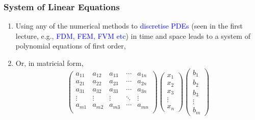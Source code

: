 \documentclass[10pt,compress]{beamer}
\begin{document}
\begin{frame}
 \frametitle{System of Linear Equations} 
\begin{enumerate}
  \item <1-> Using any of the numerical methods to \textcolor{blue}{discretise PDEs} (seen in the first lecture, e.g., \textcolor{blue}{FDM, FEM, FVM etc}) in time and space leads to a system of polynomial equations of first order, 
\item <3-> Or, in matricial form,
\begin{equation}
\begin{pmatrix}
a_{11} & a_{12} & a_{13} & \cdots & a_{1n} \\
a_{21} & a_{22} & a_{23} & \cdots & a_{2n} \\
a_{31} & a_{32} & a_{33} & \cdots & a_{3n} \\
\vdots& \vdots & \vdots& \ddots & \vdots \\
a_{m1} & a_{m2} & a_{m3} & \cdots & a_{mn} \\
\end{pmatrix}
\begin{pmatrix}
x_{1} \\ x_{2} \\ x_{3} \\ \vdots \\ x_{n}
\end{pmatrix}
\begin{pmatrix}
b_{1} \\ b_{2} \\ b_{3} \\ \vdots \\ b_{m}
\end{pmatrix}\label{linalg:matform} 
\end{equation}

\end{enumerate}   
 
\end{frame}
\end{document}
